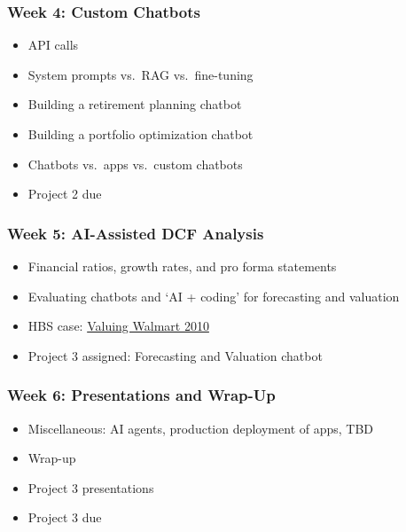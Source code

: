 \documentclass[11pt]{article}
\begin{document}
\subsubsection*{Week 4: Custom Chatbots}
\begin{itemize}\setlength{\itemsep}{0pt}
\item API calls
\item System prompts vs.\ RAG vs.\ fine-tuning
\item Building a retirement planning chatbot
\item Building a portfolio optimization chatbot
\item Chatbots vs.\ apps vs.\ custom chatbots
\item Project 2 due
\end{itemize}

\subsubsection*{Week 5: AI-Assisted DCF Analysis}
\begin{itemize}\setlength{\itemsep}{0pt}
\item Financial ratios, growth rates, and pro forma statements
\item Evaluating chatbots and `AI + coding' for forecasting and valuation
\item HBS case: \href{https://hbsp.harvard.edu/product/W11058-PDF-ENG}{Valuing Walmart 2010}
\item Project 3 assigned: Forecasting and Valuation chatbot
\end{itemize}

\subsubsection*{Week 6: Presentations and Wrap-Up}
\begin{itemize}\setlength{\itemsep}{0pt}
\item Miscellaneous: AI agents, production deployment of apps, TBD
\item Wrap-up
\item Project 3 presentations
\item Project 3 due
\end{itemize}
\end{document}
